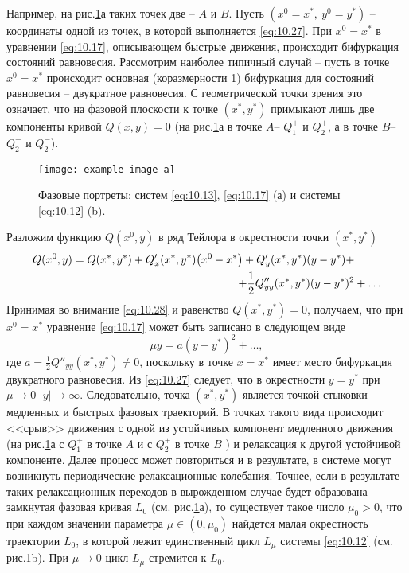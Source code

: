 Например, на рис.\ref{fig:10.6}а таких точек две -- $A$ и $B$. Пусть
$(x^0 = x^*, ~ y^0 = y^*)$ -- координаты одной из точек, в которой выполняется
\eqref{eq:10.27}. При $x^0 = x^*$ в уравнении \eqref{eq:10.17}, описывающем быстрые движения,
происходит бифуркация состояний равновесия. Рассмотрим наиболее типичный случай --
пусть в точке $x^0 = x^*$ происходит основная (коразмерности 1) бифуркация для
состояний равновесия -- двукратное равновесия. С геометрической точки зрения
это означает, что на фазовой плоскости к точке $(x^*, y^*)$ примыкают лишь
две компоненты кривой $Q(x,y) = 0$ (на рис.\ref{fig:10.6}а в точке $A$-- $Q_{1}^+$ и
$Q_{2}^+$, а в точке $B$-- $Q_{2}^+$ и $Q_{2}^-$).
\begin{figure}[h]
        \centering
        \texttt{[image: example-image-a]}
        \caption{Фазовые портреты: систем \eqref{eq:10.13}, \eqref{eq:10.17} (а) и 
        системы \eqref{eq:10.12} (b).}
        \label{fig:10.6}
\end{figure}
Разложим функцию $Q(x^0,y)$ в ряд Тейлора в окрестности точки $(x^*,y^*)$ 
\begin{equation}
        \label{eq:10.28}
\begin{align}
        Q(x^0,y) = Q(x^*,y^*) + Q'_{x}(x^*,y^*)\qty(x^0 - x^*) + Q'_y(x^*,y^*)(y-y^*)+& \\
        + \frac{1}{2} Q''_{yy}(x^*,y^*)(y-y^*)^2 &+ \dots                                                                 
\end{align}
\end{equation}
Принимая во внимание \eqref{eq:10.28} и равенство $Q(x^*,y^*)=0$, получаем, что при
$x^0 =x^*$ уравнение \eqref{eq:10.17} может быть записано в следующем виде
\begin{equation}
        \label{eq:10.29}
        \mu \dot y = a(y-y^*)^2 + \dots,
\end{equation}
где $a= \frac{1}{2} Q''_{yy}(x^*,y^*)\neq 0$, поскольку в точке $x=x^*$ имеет место 
бифуркация двукратного равновесия. Из \eqref{eq:10.27} следует, что в окрестности $y=y^*$ 
при $\mu \to 0$ $|\dot y| \to \infty$. Следовательно, точка $(x^*,y^*)$ является точкой стыковки медленных и быстрых фазовых траекторий.
В точках такого вида происходит <<срыв>> движения с одной из устойчивых компонент 
медленного движения (на рис.\ref{fig:10.6}а с $Q_{1}^+$ в точке $A$ и с $Q_{2}^+$ в точке $B$ )
и релаксация к другой устойчивой компоненте. Далее процесс может повториться и в результате, в 
системе могут возникнуть периодические релаксационные колебания. Точнее, если
в результате таких релаксационных переходов в вырожденном случае будет 
образована замкнутая фазовая кривая $L_{0}$ (см. рис.\ref{fig:10.6}а), то
существует такое число $\mu_{0}>0$, что при каждом значении параметра $\mu \in (0,\mu_{0})$ 
найдется малая окрестность траектории $L_{0}$, в которой лежит единственный цикл
$L_{\mu}$ системы \eqref{eq:10.12} (см. рис.\ref{fig:10.6}b). 
При $\mu \to 0 $ цикл $L_{\mu}$ стремится к $L_{0}$.

